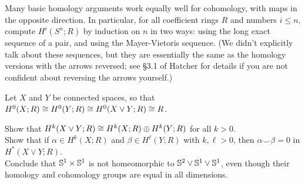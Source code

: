 \vfill\prob [Hatcher p.205 \#8(a)] Many basic homology arguments work equally well for cohomology, with maps in the opposite direction.  In particular, for all coefficient rings $R$ and numbers $i\leq n$, compute $H^i(S^n;R)$ by induction on $n$ in two ways: using the long exact sequence of a pair, and using the Mayer-Vietoris sequence.
(We didn't explicitly talk about these sequences, but they are essentially the same as the homology versions with the arrows reversed; see \S3.1 of Hatcher for details if you are not confident about reversing the arrows yourself.)

\vfill\prob Let $X$ and $Y$ be connected spaces, so that $H^0(X;R)\cong H^0(Y;R)\cong H^0(X\vee Y;R)\cong R$.

\probpart  Show that $H^k(X\vee Y;R)\cong H^k(X;R)\oplus H^k(Y;R)$ for all $k>0$.\\
\probpart Show that if $\alpha\in H^k(X;R)$ and $\beta\in H^\ell(Y;R)$ with $k,\ell>0$, then $\alpha\smile\beta=0$ in $H^*(X\vee Y;R)$.\pad\\
\probpart Conclude that $\mathbb{S}^1\times\mathbb{S}^1$ is not homeomorphic to $\mathbb{S}^2\vee\mathbb{S}^1\vee\mathbb{S}^1$, even though their homology and cohomology groups are equal in all dimensions.
\vfill